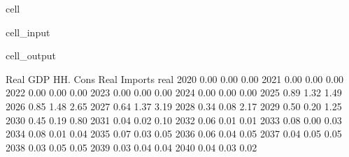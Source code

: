 \documentclass[letterpaper,10pt,english]{jupyterBook}
\begin{document}
\begin{sphinxuseclass}{cell}\begin{sphinxVerbatimInput}

\begin{sphinxuseclass}{cell_input}
\begin{sphinxVerbatim}[commandchars=\\\{\}]
\PYG{p}{[}\PYG{p}{]}
\end{sphinxVerbatim}

\end{sphinxuseclass}\end{sphinxVerbatimInput}
\begin{sphinxVerbatimOutput}

\begin{sphinxuseclass}{cell_output}
\begin{sphinxVerbatim}[commandchars=\\\{\}]
      Real GDP  HH. Cons Real  Imports real   
2020      0.00           0.00          0.00  \PYGZbs{}
2021      0.00           0.00          0.00   
2022      0.00           0.00          0.00   
2023      0.00           0.00          0.00   
2024      0.00           0.00          0.00   
2025     \PYGZhy{}0.89          \PYGZhy{}1.32         \PYGZhy{}1.49   
2026     \PYGZhy{}0.85          \PYGZhy{}1.48         \PYGZhy{}2.65   
2027     \PYGZhy{}0.64          \PYGZhy{}1.37         \PYGZhy{}3.19   
2028      0.34          \PYGZhy{}0.08         \PYGZhy{}2.17   
2029      0.50           0.20         \PYGZhy{}1.25   
2030      0.45           0.19         \PYGZhy{}0.80   
2031     \PYGZhy{}0.04           0.02         \PYGZhy{}0.10   
2032     \PYGZhy{}0.06           0.01         \PYGZhy{}0.01   
2033     \PYGZhy{}0.08           0.00          0.03   
2034     \PYGZhy{}0.08           0.01          0.04   
2035     \PYGZhy{}0.07           0.03          0.05   
2036     \PYGZhy{}0.06           0.04          0.05   
2037     \PYGZhy{}0.04           0.05          0.05   
2038     \PYGZhy{}0.03           0.05          0.05   
2039     \PYGZhy{}0.03           0.04          0.04   
2040     \PYGZhy{}0.04           0.03          0.02   


\end{sphinxVerbatim}
\end{sphinxuseclass}
\end{sphinxVerbatimOutput}
\end{sphinxuseclass}
\end{document}
